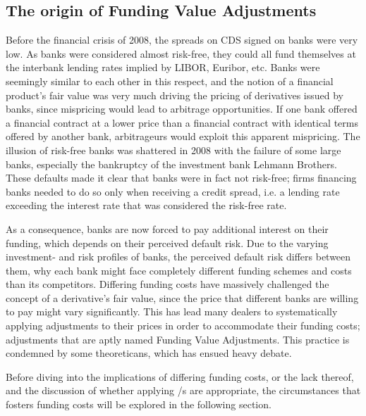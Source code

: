 \documentclass[../../../main.tex]{subfiles}
\begin{document}
    \subsection{The origin of Funding Value Adjustments}
        Before the financial crisis of 2008, the spreads on CDS signed on banks were very low. 
        As banks were considered almost risk-free, 
        they could all fund themselves at the interbank lending rates implied by LIBOR, Euribor, etc.
        Banks were seemingly similar to each other in this respect, 
        and the notion of a financial product's fair value was very much driving the pricing of derivatives issued by banks,
        since mispricing would lead to arbitrage opportunities.
        If one bank offered a financial contract at a lower price than a financial contract with identical terms
        offered by another bank, arbitrageurs would exploit this apparent mispricing. 
        The illusion of risk-free banks was shattered in 2008 with the failure of some large banks, 
        especially the bankruptcy of the investment bank Lehmann Brothers.
        These defaults made it clear that banks were in fact not risk-free; 
        firms financing banks needed to do so only when receiving a credit spread,
        i.e. a lending rate exceeding the interest rate that was considered the risk-free rate. 
        
        As a consequence, banks are now forced to pay additional interest on their funding, 
        which depends on their perceived default risk.
        Due to the varying investment- and risk profiles of banks, 
        the perceived default risk differs between them, 
        why each bank might face completely different funding schemes and costs than its competitors.
        Differing funding costs have massively challenged the concept of a derivative's fair value,
        since the price that different banks are willing to pay might vary significantly. 
        This has lead many dealers to systematically applying adjustments to their prices
        in order to accommodate their funding costs; 
        adjustments that are aptly named Funding Value Adjustments. 
        This practice is condemned by some theoreticans, 
        which has ensued heavy debate.
        
        Before diving into the implications of differing funding costs, or the lack thereof,
        and the discussion of whether applying \FVA/s are appropriate,
        the circumstances that fosters funding costs will be explored in the following section.
\end{document}
